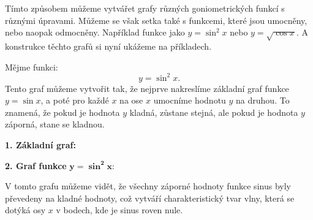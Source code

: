 \documentclass[12pt,a4paper]{article}
\begin{document}
Tímto způsobem můžeme vytvářet grafy různých goniometrických funkcí s různými úpravami.
Můžeme se však setka také s funkcemi, které jsou umocněny, nebo naopak odmocněny.
Například funkce jako $y = \sin^2 x$ nebo $y = \sqrt{\cos x}$.
A konstrukce těchto grafů si nyní ukážeme na příkladech.

\begin{examplebox}
    Mějme funkci:
    \[y = \sin^2 x.\]
    Tento graf můžeme vytvořit tak, že nejprve nakreslíme základní graf funkce $y = \sin x$,
    a poté pro každé $x$ na ose $x$ umocníme hodnotu $y$ na druhou.
    To znamená, že pokud je hodnota $y$ kladná, zůstane stejná, ale pokud je hodnota $y$ záporná, stane se kladnou.

    \textbf{1. Základní graf:}
    \begin{center}
    \end{center}

    \bigskip
    \textbf{2. Graf funkce} $\boldsymbol{y = \sin^2 x}$:
    \begin{center}
    \end{center}
    V tomto grafu můžeme vidět, že všechny záporné hodnoty funkce sinus byly převedeny na kladné hodnoty,
    což vytváří charakteristický tvar vlny, která se dotýká osy $x$ v bodech, kde je sinus roven nule.
\end{examplebox}
\end{document}
